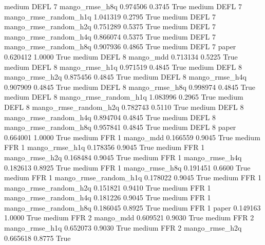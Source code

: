     medium     DEFL                 7        mango_rmse_h8q   0.974506      0.3745    True
    medium     DEFL                 7 mango_rmse_random_h1q   1.041319      0.2795    True
    medium     DEFL                 7 mango_rmse_random_h2q   0.751289      0.5375    True
    medium     DEFL                 7 mango_rmse_random_h4q   0.866074      0.5375    True
    medium     DEFL                 7 mango_rmse_random_h8q   0.907936      0.4865    True
    medium     DEFL                 7                 paper   0.620412      1.0000    True
    medium     DEFL                 8             mango_mdd   0.713134      0.5225    True
    medium     DEFL                 8        mango_rmse_h1q   0.971519      0.4845    True
    medium     DEFL                 8        mango_rmse_h2q   0.875456      0.4845    True
    medium     DEFL                 8        mango_rmse_h4q   0.907909      0.4845    True
    medium     DEFL                 8        mango_rmse_h8q   0.998974      0.4845    True
    medium     DEFL                 8 mango_rmse_random_h1q   1.083996      0.2965    True
    medium     DEFL                 8 mango_rmse_random_h2q   0.782743      0.5110    True
    medium     DEFL                 8 mango_rmse_random_h4q   0.894704      0.4845    True
    medium     DEFL                 8 mango_rmse_random_h8q   0.957841      0.4845    True
    medium     DEFL                 8                 paper   0.664001      1.0000    True
    medium      FFR                 1             mango_mdd   0.166559      0.9045    True
    medium      FFR                 1        mango_rmse_h1q   0.178356      0.9045    True
    medium      FFR                 1        mango_rmse_h2q   0.168484      0.9045    True
    medium      FFR                 1        mango_rmse_h4q   0.182613      0.8925    True
    medium      FFR                 1        mango_rmse_h8q   0.191451      0.6600    True
    medium      FFR                 1 mango_rmse_random_h1q   0.178022      0.9045    True
    medium      FFR                 1 mango_rmse_random_h2q   0.151821      0.9410    True
    medium      FFR                 1 mango_rmse_random_h4q   0.181226      0.9045    True
    medium      FFR                 1 mango_rmse_random_h8q   0.186045      0.8925    True
    medium      FFR                 1                 paper   0.149163      1.0000    True
    medium      FFR                 2             mango_mdd   0.609521      0.9030    True
    medium      FFR                 2        mango_rmse_h1q   0.652073      0.9030    True
    medium      FFR                 2        mango_rmse_h2q   0.665618      0.8775    True
